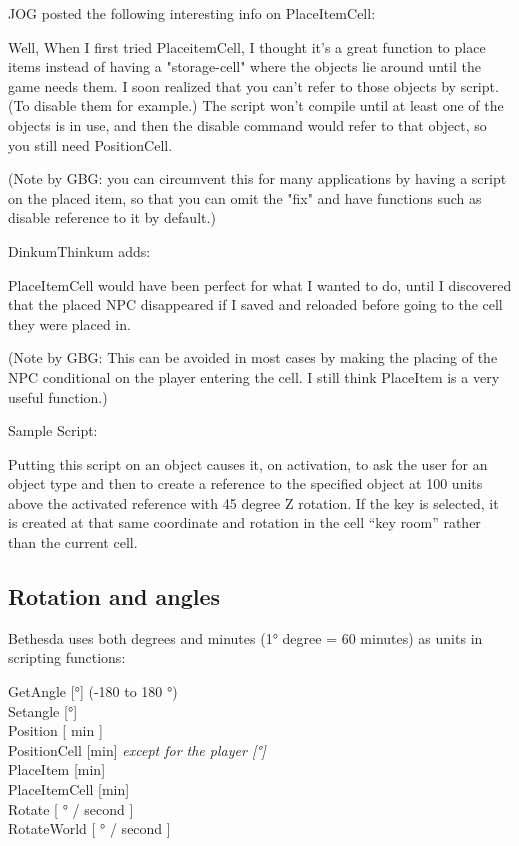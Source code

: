 \documentclass[
]{article}
\begin{document}
JOG posted the following interesting info on PlaceItemCell:

Well, When I first tried PlaceitemCell, I thought it's a great function
to place items instead of having a "storage-cell" where the objects lie
around until the game needs them. I soon realized that you can't refer
to those objects by script. (To disable them for example.) The script
won't compile until at least one of the objects is in use, and then the
disable command would refer to that object, so you still need
PositionCell.

(Note by GBG: you can circumvent this for many applications by having a
script on the placed item, so that you can omit the "fix" and have
functions such as disable reference to it by default.)

DinkumThinkum adds:

PlaceItemCell would have been perfect for what I wanted to do, until I
discovered that the placed NPC disappeared if I saved and reloaded
before going to the cell they were placed in.

(Note by GBG: This can be avoided in most cases by making the placing of
the NPC conditional on the player entering the cell. I still think
PlaceItem is a very useful function.)

Sample Script:

Putting this script on an object causes it, on activation, to ask the
user for an object type and then to create a reference to the specified
object at 100 units above the activated reference with 45 degree Z
rotation. If the key is selected, it is created at that same coordinate
and rotation in the cell ``key room'' rather than the current cell.



\hypertarget{rotation-and-angles}{%
\subsection{\texorpdfstring{Rotation and angles
}{Rotation and angles }}\label{rotation-and-angles}}

Bethesda uses both degrees and minutes (1° degree = 60 minutes) as units
in scripting functions:

GetAngle {[}°{]} (-180 to 180 °)\\
Setangle {[}°{]}\\
Position {[} min {]}\\
PositionCell {[}min{]} \emph{except for the player {[}°{]}}\\
PlaceItem {[}min{]}\\
PlaceItemCell {[}min{]}\\
Rotate {[} ° / second {]}\\
RotateWorld {[} ° / second {]}
\end{document}

